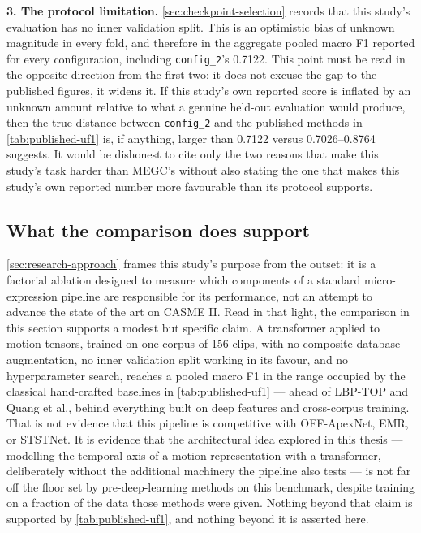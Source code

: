 \textbf{3. The protocol limitation.} \autoref{sec:checkpoint-selection} records that this study's evaluation has no inner validation split. This is an optimistic bias of unknown magnitude in every fold, and therefore in the aggregate pooled macro F1 reported for every configuration, including \texttt{config\_2}'s 0.7122. This point must be read in the opposite direction from the first two: it does not excuse the gap to the published figures, it widens it. If this study's own reported score is inflated by an unknown amount relative to what a genuine held-out evaluation would produce, then the true distance between \texttt{config\_2} and the published methods in \autoref{tab:published-uf1} is, if anything, larger than 0.7122 versus 0.7026--0.8764 suggests. It would be dishonest to cite only the two reasons that make this study's task harder than MEGC's without also stating the one that makes this study's own reported number more favourable than its protocol supports.

\subsection{What the comparison does support}
\label{sec:comparison-supports}

\autoref{sec:research-approach} frames this study's purpose from the outset: it is a factorial ablation designed to measure which components of a standard micro-expression pipeline are responsible for its performance, not an attempt to advance the state of the art on CASME II. Read in that light, the comparison in this section supports a modest but specific claim. A transformer applied to motion tensors, trained on one corpus of 156 clips, with no composite-database augmentation, no inner validation split working in its favour, and no hyperparameter search, reaches a pooled macro F1 in the range occupied by the classical hand-crafted baselines in \autoref{tab:published-uf1} --- ahead of LBP-TOP and Quang et al., behind everything built on deep features and cross-corpus training. That is not evidence that this pipeline is competitive with OFF-ApexNet, EMR, or STSTNet. It is evidence that the architectural idea explored in this thesis --- modelling the temporal axis of a motion representation with a transformer, deliberately without the additional machinery the pipeline also tests --- is not far off the floor set by pre-deep-learning methods on this benchmark, despite training on a fraction of the data those methods were given. Nothing beyond that claim is supported by \autoref{tab:published-uf1}, and nothing beyond it is asserted here.


